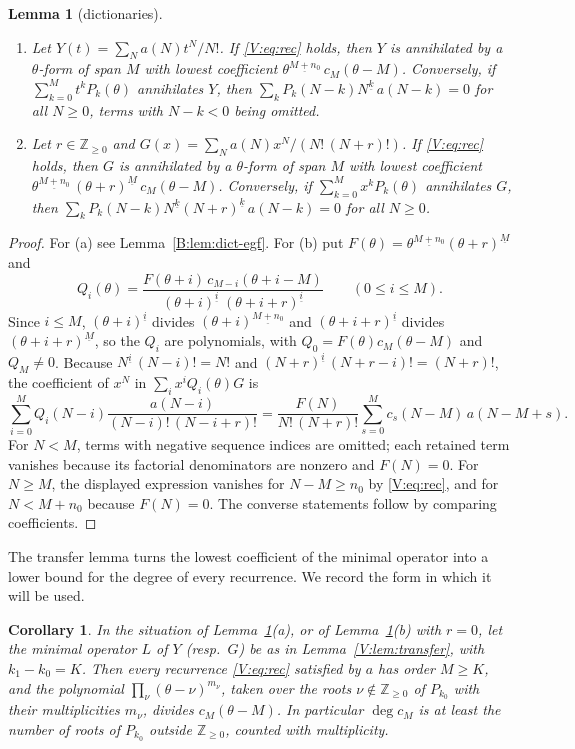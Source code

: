 \documentclass[11pt,a4paper]{article}
\newtheorem{lemma}[theorem]{Lemma}
\newtheorem{corollary}[theorem]{Corollary}
\theoremstyle{definition}
\theoremstyle{remark}
\newcommand{\Z}{\mathbb Z}
\newcommand{\ff}[2]{#1^{\underline{#2}}}
\numberwithin{equation}{section}
\begin{document}
\begin{lemma}[dictionaries]\label{V:lem:dict}
\begin{enumerate}
\item[(a)] Let $Y(t)=\sum_Na(N)t^N/N!$. If \eqref{V:eq:rec} holds, then $Y$ is annihilated by a $\theta$-form of span $M$ with lowest coefficient $\ff{\theta}{M+n_0}\,c_M(\theta-M)$. Conversely, if $\sum_{k=0}^{M}t^kP_k(\theta)$ annihilates $Y$, then $\sum_kP_k(N-k)\ff{N}{k}\,a(N-k)=0$ for all $N\ge0$, terms with $N-k<0$ being omitted.
\item[(b)] Let $r\in\Z_{\ge0}$ and $G(x)=\sum_Na(N)x^N/(N!\,(N+r)!)$. If \eqref{V:eq:rec} holds, then $G$ is annihilated by a $\theta$-form of span $M$ with lowest coefficient $\ff{\theta}{M+n_0}\,\ff{(\theta+r)}{M}\,c_M(\theta-M)$. Conversely, if $\sum_{k=0}^{M}x^kP_k(\theta)$ annihilates $G$, then $\sum_kP_k(N-k)\ff Nk\ff{(N+r)}k\,a(N-k)=0$ for all $N\ge0$.
\end{enumerate}
\end{lemma}

\begin{proof}
For (a) see Lemma~\ref{B:lem:dict-egf}. For (b) put $F(\theta)=\ff\theta{M+n_0}\ff{(\theta+r)}M$ and
\[
Q_i(\theta)=\frac{F(\theta+i)\,c_{M-i}(\theta+i-M)}{\ff{(\theta+i)}{i}\;\ff{(\theta+i+r)}{i}}\qquad(0\le i\le M).
\]
Since $i\le M$, $\ff{(\theta+i)}i$ divides $\ff{(\theta+i)}{M+n_0}$ and $\ff{(\theta+i+r)}i$ divides $\ff{(\theta+i+r)}M$, so the $Q_i$ are polynomials, with $Q_0=F(\theta)c_M(\theta-M)$ and $Q_M\ne0$. Because $\ff Ni\,(N-i)!=N!$ and $\ff{(N+r)}i\,(N+r-i)!=(N+r)!$, the coefficient of $x^N$ in $\sum_ix^iQ_i(\theta)G$ is
\[
\sum_{i=0}^{M}Q_i(N-i)\frac{a(N-i)}{(N-i)!\,(N-i+r)!}=\frac{F(N)}{N!\,(N+r)!}\sum_{s=0}^{M}c_s(N-M)\,a(N-M+s).
\]
For $N<M$, terms with negative sequence indices are omitted; each retained term vanishes because its factorial denominators are nonzero and $F(N)=0$. For $N\ge M$, the displayed expression vanishes for $N-M\ge n_0$ by \eqref{V:eq:rec}, and for $N<M+n_0$ because $F(N)=0$. The converse statements follow by comparing coefficients.
\end{proof}

The transfer lemma turns the lowest coefficient of the minimal operator into a lower bound for the degree of every recurrence. We record the form in which it will be used.

\begin{corollary}\label{V:cor:degree}
In the situation of Lemma~\ref{V:lem:dict}(a), or of Lemma~\ref{V:lem:dict}(b) with $r=0$, let the minimal operator $L$ of $Y$ \textup{(}resp.\ $G$\textup{)} be as in Lemma~\ref{V:lem:transfer}, with $k_1-k_0=K$. Then every recurrence \eqref{V:eq:rec} satisfied by $a$ has order $M\ge K$, and the polynomial $\prod_{\nu}(\theta-\nu)^{m_\nu}$, taken over the roots $\nu\notin\Z_{\ge0}$ of $P_{k_0}$ with their multiplicities $m_\nu$, divides $c_M(\theta-M)$. In particular $\deg c_M$ is at least the number of roots of $P_{k_0}$ outside $\Z_{\ge0}$, counted with multiplicity.
\end{corollary}
\end{document}
